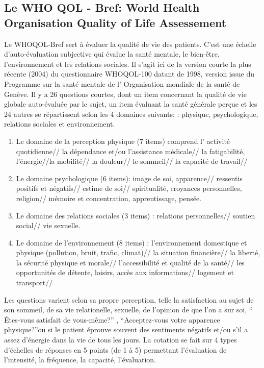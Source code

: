  \subsection{Le WHO QOL - Bref:  World Health
   Organisation Quality of Life Assessement }
 Le  WHOQOL-Bref sert à évaluer la qualité de vie des patients. C'est une échelle
d'auto-évaluation subjective qui évalue la santé mentale, le
bien-être, l'environnement et les relations sociales.
Il s'agit ici de la version courte  la plus récente (2004) du questionnaire
 WHOQOL-100 datant de 1998, version issue du Programme sur la santé
 mentale de l'
Organisation mondiale de la santé de Genève. Il y a 26 questions
courtes, dont un item concernant la qualité de vie globale
auto-évaluée par le sujet, un item évaluant la santé générale perçue
et les 24 autres se répartissent selon les 4 domaines suivants:  
: physique, psychologique, relations sociales et environnement.
\begin{enumerate}
\item  Le domaine de la perception physique (7 items) comprend l' activité quotidienne// la dépendance et/ou l'assistance médicale// la fatigabilité, l'énergie//la mobilité// la douleur// le sommeil// la capacité de travail//
	
\item Le domaine psychologique (6 items):  image de soi, apparence// ressentis positifs et négatifs// estime de soi// spiritualité, croyances personnelles, religion// mémoire et concentration, apprentissage, pensée.
		
\item Le domaine des relations sociales (3 items) : relations personnelles// soutien social// vie sexuelle.
			
\item Le domaine de l'environnement (8 items) :
                         l'environnement domestique et physique
                         (pollution, bruit, trafic, climat)// la
                         situation financière//  la liberté, la
                         sécurité physique et morale//
                         l'accessibilité et qualité de la santé// les
                         opportunités de détente, loisirs, accès aux
                         informations// logement et transport// 
\end{enumerate}
		
	

Les questions varient selon sa propre perception, telle la satisfaction
au sujet de son  sommeil, de sa vie relationelle, sexuelle, de
l'opinion de que l'on a sur soi,  `` Êtes-vous satisfait de
vous-même?'' , ``Acceptez-vous votre apparence physique?''ou si le patient éprouve souvent des sentiments négatifs
et/ou s'il a assez d'énergie dans la vie de tous les jours.
La cotation se fait sur 4 types d'échelles de réponses en 5 points (de 1 à 5)
permettant l'évaluation de l'intensité, la fréquence, la capacité, l'évaluation.

